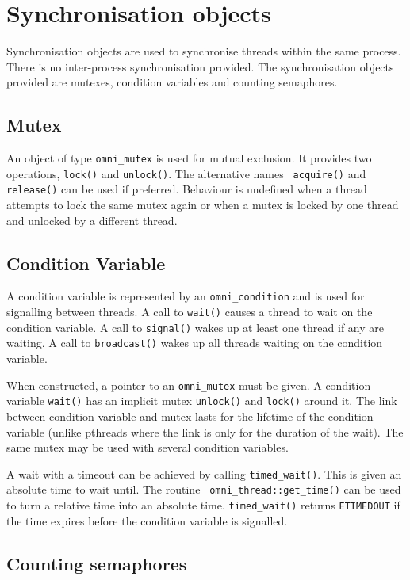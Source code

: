 \documentclass[11pt,twoside,onecolumn]{article}
\begin{document}
\section{Synchronisation objects}

Synchronisation objects are used to synchronise threads within the same
process.  There is no inter-process synchronisation provided.  The
synchronisation objects provided are mutexes, condition variables and counting
semaphores.

\subsection{Mutex}

An object of type {\tt omni\_mutex} is used for mutual exclusion.  It provides
two operations, {\tt lock()} and {\tt unlock()}.  The alternative names {\tt
acquire()} and {\tt release()} can be used if preferred.  Behaviour is
undefined when a thread attempts to lock the same mutex again or when a mutex
is locked by one thread and unlocked by a different thread.


\subsection{Condition Variable}

A condition variable is represented by an {\tt omni\_condition} and is used for
signalling between threads.  A call to {\tt wait()} causes a thread to wait on
the condition variable.  A call to {\tt signal()} wakes up at least one thread
if any are waiting.  A call to {\tt broadcast()} wakes up all threads waiting
on the condition variable.

When constructed, a pointer to an {\tt omni\_mutex} must be given.  A condition
variable {\tt wait()} has an implicit mutex {\tt unlock()} and {\tt lock()}
around it.  The link between condition variable and mutex lasts for the
lifetime of the condition variable (unlike pthreads where the link is only for
the duration of the wait).  The same mutex may be used with several condition
variables.

A wait with a timeout can be achieved by calling {\tt timed\_wait()}.  This is
given an absolute time to wait until.  The routine {\tt
omni\_thread::get\_time()} can be used to turn a relative time into an absolute
time.  {\tt timed\_wait()} returns {\tt ETIMEDOUT} if the time expires before
the condition variable is signalled.


\subsection{Counting semaphores}
\end{document}
